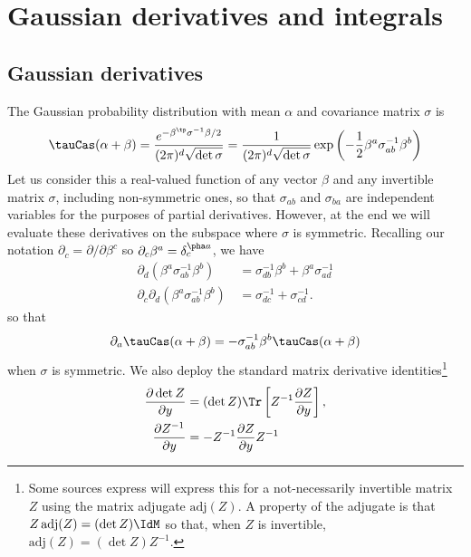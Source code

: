 \documentclass{article}
\numberwithin{equation}{section}
\begin{document}
\section{Gaussian derivatives and integrals}\label{sec:gaussian-derivatives-and-integrals}

\subsection{Gaussian derivatives}\label{sec:gaussian-derivatives}

The Gaussian probability distribution with mean $\alpha$ and covariance matrix $\sigma$ is  
\begin{align}
\tauCas(\alpha+\beta)= \frac{ e^{-\beta^\tp \sigma^{-1}\beta/2}}{(2\pi)^d\sqrt{\det\sigma}} =  \frac{1}{(2\pi)^d\sqrt{\det\sigma}}\exp\left(-\frac{1}{2}\beta^a \sigma^{-1}_{ab}\beta^b\right)
\end{align}
Let us consider this a real-valued function of any vector $\beta$ and any invertible matrix $\sigma$, including non-symmetric ones, so that $\sigma_{ab}$ and $\sigma_{ba}$ are independent variables for the purposes of partial derivatives. However, at the end we will evaluate these derivatives on the subspace where $\sigma$ is symmetric. 
Recalling our notation $\partial_c = \partial/\partial\beta^c$ so $\partial_c \beta^a = \delta_c^{\pha a}$, 
we have
\begin{align}
\partial_d \left(\beta^a \sigma^{-1}_{ab}\beta^b\right) \,&=  \sigma^{-1}_{db}\beta^b + \beta^a\sigma^{-1}_{ad} 
\\
 \partial_c \partial_d \left(\beta^a \sigma^{-1}_{ab}\beta^b\right) \,&=  
 \sigma^{-1}_{dc} + \sigma^{-1}_{cd}.
\end{align}
so that
\begin{align}
\partial_a \tauCas(\alpha+\beta) = -\sigma^{-1}_{ab}\beta^b\tauCas(\alpha+\beta) 
\end{align}
when $\sigma$ is symmetric. 
We also deploy the standard \cite{petersen2012matrix}  matrix derivative identities\footnote{Some sources express will express this for a not-necessarily invertible matrix $Z$ using the matrix adjugate $\mathrm{adj}(Z)$. A property of the adjugate is that $Z\, \mathrm{adj}(Z) = (\det Z)\IdM$ so that, when $Z$ is invertible, $\mathrm{adj}(Z) = (\det Z)Z^{-1}.$}
\begin{align}
\frac{\partial \det Z}{\partial y} &= (\det Z) \Tr\left[Z^{-1}\frac{\partial Z}{\partial y}\right],\\
\frac{\partial Z^{-1}}{\partial y} &= -Z^{-1}\frac{\partial Z}{\partial y} Z^{-1}
\end{align}
\end{document}
